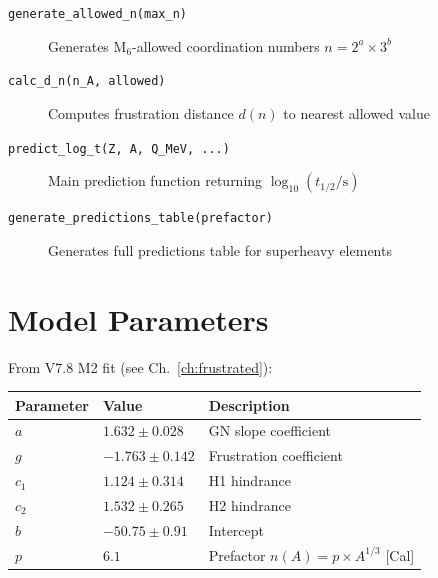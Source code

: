 \begin{description}
    \item[\texttt{generate\_allowed\_n(max\_n)}]
        Generates M$_6$-allowed coordination numbers $n = 2^a \times 3^b$
    \item[\texttt{calc\_d\_n(n\_A, allowed)}]
        Computes frustration distance $d(n)$ to nearest allowed value
    \item[\texttt{predict\_log\_t(Z, A, Q\_MeV, ...)}]
        Main prediction function returning $\log_{10}(t_{1/2}/\text{s})$
    \item[\texttt{generate\_predictions\_table(prefactor)}]
        Generates full predictions table for superheavy elements
\end{description}

\section{Model Parameters}

From V7.8 M2 fit (see Ch.~\ref{ch:frustrated}):

\begin{center}
\begin{tabular}{lll}
    \toprule
    Parameter & Value & Description \\
    \midrule
    $a$ & $1.632 \pm 0.028$ & GN slope coefficient \\
    $g$ & $-1.763 \pm 0.142$ & Frustration coefficient \\
    $c_1$ & $1.124 \pm 0.314$ & H1 hindrance \\
    $c_2$ & $1.532 \pm 0.265$ & H2 hindrance \\
    $b$ & $-50.75 \pm 0.91$ & Intercept \\
    $p$ & $6.1$ & Prefactor $n(A) = p \times A^{1/3}$ [Cal] \\
    \bottomrule
\end{tabular}
\end{center}


